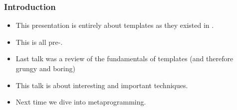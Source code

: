 \begin{frame}[fragile,t]
\frametitle{Introduction}
\begin{itemize}[<+->]
\item This presentation is entirely about templates as they existed in
.
\vskip 12pt
\item This is all pre-.
\vskip 12pt

\item Last talk was a review of the fundamentals of templates (and
  therefore grungy and boring)
\vskip 12pt
\item This talk is about interesting and important techniques.
\vskip 12pt
\item Next time we dive into metaprogramming.
\end{itemize}


\end{frame}
